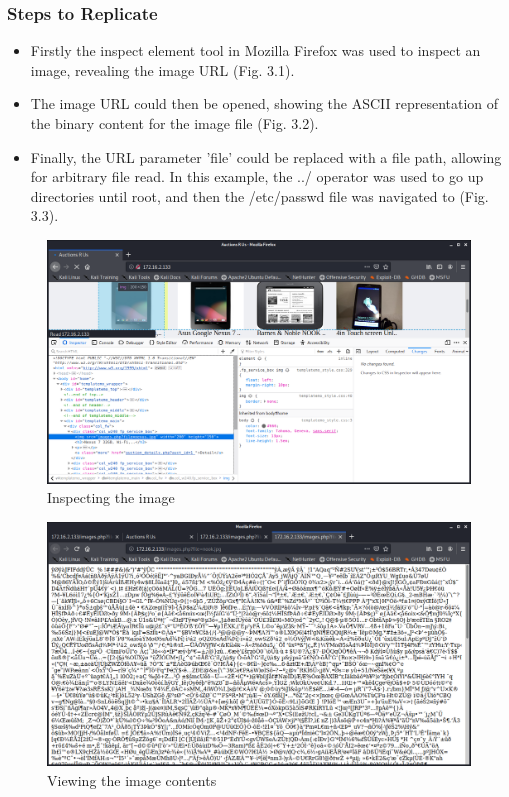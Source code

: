 \documentclass{report}
\begin{document}
\subsubsection{Steps to Replicate}
\begin{itemize}
		\item Firstly the inspect element tool in Mozilla Firefox was used to inspect an image, revealing the image URL (Fig. 3.1).
		\item The image URL could then be opened, showing the ASCII representation of the binary content for the image file (Fig. 3.2).
		\item Finally, the URL parameter 'file' could be replaced with a file path, allowing for arbitrary file read. In this example, the ../ operator was used to go up directories until root, and then the /etc/passwd file was navigated to (Fig. 3.3).
\end{itemize}
\begin{figure}
	\centering
	\includegraphics[scale=0.4]{img/pathtraversal1.png}
	\caption{Inspecting the image}
\end{figure}
\begin{figure}
	\centering
	\includegraphics[scale=0.4]{img/pathtraversal2.png}
	\caption{Viewing the image contents}
\end{figure}
\end{document}
